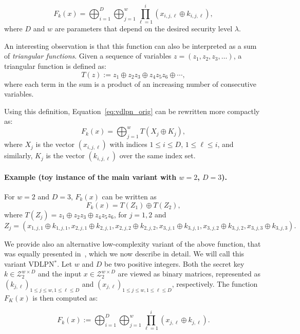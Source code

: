 \documentclass[journal=tosc,submission]{iacrtrans}
\theoremstyle{theorem}
\newcommand\Z{\mathcal{Z}}
\begin{document}
\begin{equation} \label{eq:vdlpn_orig}
    F_k(x) = \bigoplus_{i=1}^D \bigoplus_{j=1}^w \prod_{\ell=1}^i \left(x_{i,j,\ell} \oplus k_{i,j,\ell}\right),
\end{equation}
where $D$ and $w$ are parameters that depend on the desired security level $\lambda$.

An interesting observation is that this function can also be interpreted as a sum of \emph{triangular functions}. Given a sequence of variables $ z = (z_1, z_2, z_3, \dots) $, a triangular function is defined as:
\[
T(z) := z_1 \oplus z_2 z_3 \oplus z_4 z_5 z_6 \oplus \cdots,
\]
where each term in the sum is a product of an increasing number of consecutive variables. 

Using this definition, Equation~\eqref{eq:vdlpn_orig} can be rewritten more compactly as:
\[
F_k(x) = \bigoplus_{j=1}^w T(X_j \oplus K_j),
\]
where $ X_j $ is the vector $(x_{i,j,\ell})$ with indices $ 1 \leq i \leq D $, $ 1 \leq \ell \leq i $, and similarly, $ K_j $ is the vector $(k_{i,j,\ell})$ over the same index set.

\paragraph{Example (toy instance of the main variant with $w = 2$, $D = 3$).}
For $w = 2$ and $D = 3$, $F_k(x)$ can be written as 
\[
F_k(x) = T(Z_1) \oplus T(Z_2),
\]
where $T(Z_j) = z_1 \oplus z_2 z_3 \oplus z_4 z_5 z_6$, for $j = 1, 2$ and
\[
Z_j = \left(
x_{1,j,1} \oplus k_{1,j,1},
x_{2,j,1} \oplus k_{2,j,1}, 
x_{2,j,2} \oplus k_{2,j,2},
x_{3,j,1} \oplus k_{3,j,1}, 
x_{3,j,2} \oplus k_{3,j,2}, 
x_{3,j,3} \oplus k_{3,j,3}
\right).
\]

We provide also an alternative low-complexity variant of the above function, that was equally presented in~\cite{vdlpn}, which we now describe in detail. We will call this variant {\sf VDLPN}$^*$. Let $w$ and $D$ be two positive integers. Both the secret key $k \in \Z_2^{w \times D}$ and the input $x \in \Z_2^{w \times D}$ are viewed as binary matrices, represented as $(k_{j,\ell})_{1 \leq j \leq w, 1 \leq \ell \leq D}$ and $(x_{j,\ell})_{1 \leq j \leq w, 1 \leq \ell \leq D}$, respectively. The function $F_K(x)$ is then computed as:

\begin{equation} \label{eq:vdlpn_agg}
    F_k(x) := \bigoplus_{i=1}^D \bigoplus_{j=1}^w\prod_{\ell=1}^i (x_{j,\ell} \oplus k_{j,\ell}).
\end{equation}
\end{document}
